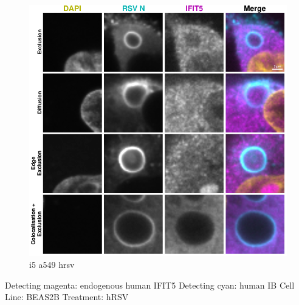 \begin{figure}
    \centering
    \includegraphics[width=1\linewidth]{09. Chapter 4/Figs/02. Infection/03. IFIT5/03. a549 i5.pdf}
    \caption[i5 a549 hrsv]{i5 a549 hrsv}
    \label{fig:i5 a549 hrsv}
\end{figure}

Detecting magenta: endogenous human IFIT5 \newline
Detecting cyan: human IB \newline
Cell Line: BEAS2B \newline
Treatment: hRSV \newline

